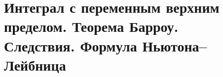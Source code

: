 \section{Интеграл с переменным верхним пределом. Теорема Барроу. Следствия. Формула Ньютона–Лейбница}
